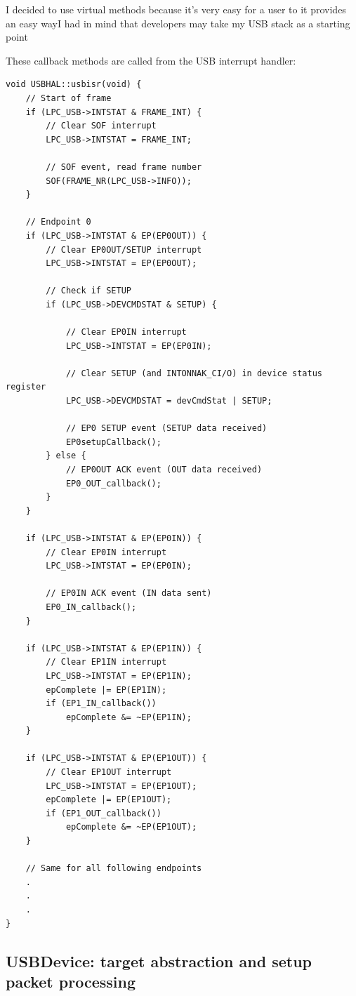 \documentclass[pdftex,10pt,a4paper]{report}
\begin{document}
I decided to use virtual methods because it's very easy for a user to it provides an easy wayI had in mind that developers may take my USB stack as a starting point

These callback methods are called from the USB interrupt handler:

\begin{lstlisting}[label=Main part of the USB interrupt handler,caption=Main part of the USB interrupt handler]
void USBHAL::usbisr(void) {
    // Start of frame
    if (LPC_USB->INTSTAT & FRAME_INT) {
        // Clear SOF interrupt
        LPC_USB->INTSTAT = FRAME_INT;

        // SOF event, read frame number
        SOF(FRAME_NR(LPC_USB->INFO));
    }

    // Endpoint 0
    if (LPC_USB->INTSTAT & EP(EP0OUT)) {
        // Clear EP0OUT/SETUP interrupt
        LPC_USB->INTSTAT = EP(EP0OUT);

        // Check if SETUP
        if (LPC_USB->DEVCMDSTAT & SETUP) {

            // Clear EP0IN interrupt
            LPC_USB->INTSTAT = EP(EP0IN);

            // Clear SETUP (and INTONNAK_CI/O) in device status register
            LPC_USB->DEVCMDSTAT = devCmdStat | SETUP;

            // EP0 SETUP event (SETUP data received)
            EP0setupCallback();
        } else {
            // EP0OUT ACK event (OUT data received)
            EP0_OUT_callback();
        }
    }

    if (LPC_USB->INTSTAT & EP(EP0IN)) {
        // Clear EP0IN interrupt
        LPC_USB->INTSTAT = EP(EP0IN);

        // EP0IN ACK event (IN data sent)
        EP0_IN_callback();
    }

    if (LPC_USB->INTSTAT & EP(EP1IN)) {
        // Clear EP1IN interrupt
        LPC_USB->INTSTAT = EP(EP1IN);
        epComplete |= EP(EP1IN);
        if (EP1_IN_callback())
            epComplete &= ~EP(EP1IN);
    }

    if (LPC_USB->INTSTAT & EP(EP1OUT)) {
        // Clear EP1OUT interrupt
        LPC_USB->INTSTAT = EP(EP1OUT);
        epComplete |= EP(EP1OUT);
        if (EP1_OUT_callback())
            epComplete &= ~EP(EP1OUT);
    }
    
    // Same for all following endpoints
    .
    .
    .
}\end{lstlisting}


\subsection{USBDevice: target abstraction and setup packet processing}
\end{document}
